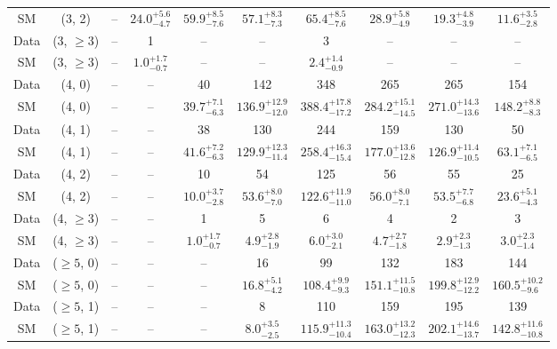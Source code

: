 \begin{table}[h!]
{\begin{tabular}{cccccccccc}
	SM & (3, 2) & -- & $24.0^{+ 5.6 }_{- 4.7 }$ & $59.9^{+ 8.5 }_{- 7.6 }$ & $57.1^{+ 8.3 }_{- 7.3 }$ & $65.4^{+ 8.5 }_{- 7.6 }$ & $28.9^{+ 5.8 }_{- 4.9 }$ & $19.3^{+ 4.8 }_{- 3.9 }$ & $11.6^{+ 3.5 }_{- 2.8 }$ \\[0.5ex] 
	Data & (3, $\ge3$) & -- & 1 & -- & -- & 3 & -- & -- & -- \\[0.5ex] 
	SM & (3, $\ge3$) & -- & $1.0^{+ 1.7 }_{- 0.7 }$ & -- & -- & $2.4^{+ 1.4 }_{- 0.9 }$ & -- & -- & -- \\[0.5ex] 
	Data & (4, 0) & -- & -- & 40 & 142 & 348 & 265 & 265 & 154 \\[0.5ex] 
	SM & (4, 0) & -- & -- & $39.7^{+ 7.1 }_{- 6.3 }$ & $136.9^{+ 12.9 }_{- 12.0 }$ & $388.4^{+ 17.8 }_{- 17.2 }$ & $284.2^{+ 15.1 }_{- 14.5 }$ & $271.0^{+ 14.3 }_{- 13.6 }$ & $148.2^{+ 8.8 }_{- 8.3 }$ \\[0.5ex] 
	Data & (4, 1) & -- & -- & 38 & 130 & 244 & 159 & 130 & 50 \\[0.5ex] 
	SM & (4, 1) & -- & -- & $41.6^{+ 7.2 }_{- 6.3 }$ & $129.9^{+ 12.3 }_{- 11.4 }$ & $258.4^{+ 16.3 }_{- 15.4 }$ & $177.0^{+ 13.6 }_{- 12.8 }$ & $126.9^{+ 11.4 }_{- 10.5 }$ & $63.1^{+ 7.1 }_{- 6.5 }$ \\[0.5ex] 
	Data & (4, 2) & -- & -- & 10 & 54 & 125 & 56 & 55 & 25 \\[0.5ex] 
	SM & (4, 2) & -- & -- & $10.0^{+ 3.7 }_{- 2.8 }$ & $53.6^{+ 8.0 }_{- 7.0 }$ & $122.6^{+ 11.9 }_{- 11.0 }$ & $56.0^{+ 8.0 }_{- 7.1 }$ & $53.5^{+ 7.7 }_{- 6.8 }$ & $23.6^{+ 5.1 }_{- 4.3 }$ \\[0.5ex] 
	Data & (4, $\ge3$) & -- & -- & 1 & 5 & 6 & 4 & 2 & 3 \\[0.5ex] 
	SM & (4, $\ge3$) & -- & -- & $1.0^{+ 1.7 }_{- 0.7 }$ & $4.9^{+ 2.8 }_{- 1.9 }$ & $6.0^{+ 3.0 }_{- 2.1 }$ & $4.7^{+ 2.7 }_{- 1.8 }$ & $2.9^{+ 2.3 }_{- 1.3 }$ & $3.0^{+ 2.3 }_{- 1.4 }$ \\[0.5ex] 
	Data & ($\ge5$, 0) & -- & -- & -- & 16 & 99 & 132 & 183 & 144 \\[0.5ex] 
	SM & ($\ge5$, 0) & -- & -- & -- & $16.8^{+ 5.1 }_{- 4.2 }$ & $108.4^{+ 9.9 }_{- 9.3 }$ & $151.1^{+ 11.5 }_{- 10.8 }$ & $199.8^{+ 12.9 }_{- 12.2 }$ & $160.5^{+ 10.2 }_{- 9.6 }$ \\[0.5ex] 
	Data & ($\ge5$, 1) & -- & -- & -- & 8 & 110 & 159 & 195 & 139 \\[0.5ex] 
	SM & ($\ge5$, 1) & -- & -- & -- & $8.0^{+ 3.5 }_{- 2.5 }$ & $115.9^{+ 11.3 }_{- 10.4 }$ & $163.0^{+ 13.2 }_{- 12.3 }$ & $202.1^{+ 14.6 }_{- 13.7 }$ & $142.8^{+ 11.6 }_{- 10.8 }$ \\[0.5ex] 

\end{tabular}}
\end{table}
